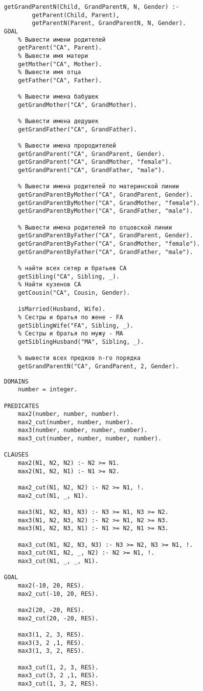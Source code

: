 \begin{lstlisting}[caption=Программа <<Предки>>]
	getGrandParentN(Child, GrandParentN, N, Gender) :-
		getParent(Child, Parent),
		getParentN(Parent, GrandParentN, N, Gender).										 	
GOAL
	% Вывести имени родителей
	getParent("CA", Parent).
	% Вывести имя матери
	getMother("CA", Mother).
	% Вывести имя отца
	getFather("CA", Father).
	
	% Вывести имена бабушек 
	getGrandMother("CA", GrandMother).
	
	% Вывести имена дедушек
	getGrandFather("CA", GrandFather).
	
	% Вывести имена прородителей 
	getGrandParent("CA", GrandParent, Gender).
	getGrandParent("CA", GrandMother, "female").
	getGrandParent("CA", GrandFather, "male").
	
	% Вывести имена родителей по материнской линии
	getGrandParentByMother("CA", GrandParent, Gender).
	getGrandParentByMother("CA", GrandMother, "female").
	getGrandParentByMother("CA", GrandFather, "male").
	
	% Вывести имена родителей по отцовской линии
	getGrandParentByFather("CA", GrandParent, Gender).
	getGrandParentByFather("CA", GrandMother, "female").
	getGrandParentByFather("CA", GrandFather, "male").
	
	% найти всех сетер и братьев CA
	getSibling("CA", Sibling, _).	
	% Найти кузенов CA	
	getCousin("CA", Cousin, Gender).
	
	isMarried(Husband, Wife).
	% Сестры и братья по жене - FA
	getSiblingWife("FA", Sibling, _).
	% Сестры и братья по мужу - MA
	getSiblingHusband("MA", Sibling, _).
	
	% вывести всех предков n-го порядка
	getGrandParentN("CA", GrandParent, 2, Gender).	
\end{lstlisting}

\clearpage

\begin{lstlisting}[caption=Дополнение к проограмме <<Предки>>]
DOMAINS
	number = integer.

PREDICATES
	max2(number, number, number).
	max2_cut(number, number, number).
	max3(number, number, number, number).
	max3_cut(number, number, number, number).

CLAUSES
	max2(N1, N2, N2) :- N2 >= N1.
	max2(N1, N2, N1) :- N1 >= N2.
	
	max2_cut(N1, N2, N2) :- N2 >= N1, !.
	max2_cut(N1, _, N1).
	
	max3(N1, N2, N3, N3) :- N3 >= N1, N3 >= N2.
	max3(N1, N2, N3, N2) :- N2 >= N1, N2 >= N3.
	max3(N1, N2, N3, N1) :- N1 >= N2, N1 >= N3.
	
	max3_cut(N1, N2, N3, N3) :- N3 >= N2, N3 >= N1, !.
	max3_cut(N1, N2, _, N2) :- N2 >= N1, !.
	max3_cut(N1, _, _, N1).	

GOAL
	max2(-10, 20, RES).
	max2_cut(-10, 20, RES).
	
	max2(20, -20, RES).
	max2_cut(20, -20, RES). 
	
	max3(1, 2, 3, RES).
	max3(3, 2 ,1, RES).
	max3(1, 3, 2, RES).
	
	max3_cut(1, 2, 3, RES).
	max3_cut(3, 2 ,1, RES).
	max3_cut(1, 3, 2, RES).
\end{lstlisting}